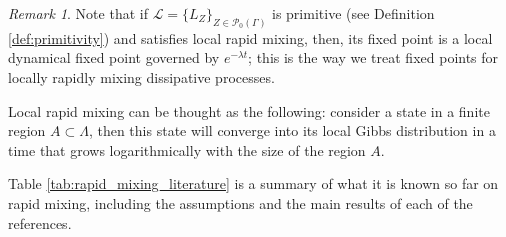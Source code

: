 \documentclass[11pt]{article}
\numberwithin{equation}{section}
\numberwithin{figure}{section}
\numberwithin{table}{section}
\theoremstyle{definition}
\theoremstyle{plain}
\theoremstyle{remark}
\newtheorem{obs}[thm]{Remark}
\newcommand{\Li}{\mathcal{L}}
\begin{document}
\begin{obs}
    Note that if $\Li=\{L_Z\}_{Z\in \mathcal{P}_0(\Gamma)}$ is primitive (see Definition \ref{def:primitivity}) and satisfies local rapid mixing, then, its fixed point is a local dynamical fixed point governed by $e^{-\lambda t}$; this is the way we treat fixed points for locally rapidly mixing dissipative processes. 
\end{obs}

Local rapid mixing can be thought as the following: consider a state in a finite region $A\subset \Lambda$, then this state will converge into its local Gibbs distribution in a time that grows logarithmically with the size of the region $A$.

Table \ref{tab:rapid_mixing_literature} is a summary of what it is known so far on rapid mixing, including the assumptions and the main results of each of the references.
\end{document}
